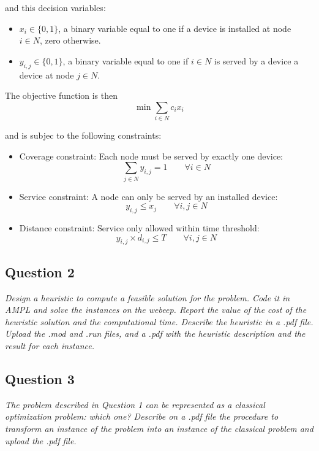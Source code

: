 \documentclass[10pt]{article}
\begin{document}
    and this decision variables:
    \begin{itemize}
        \item $x_i \in \{0,1\}$, a binary variable equal to one if a device is installed at node $i \in N$, zero otherwise.
        \item $y_{i,j} \in \{0,1\}$, a binary variable equal to one if $i \in N$ is served by a device a device at node $j \in N$.
    \end{itemize}

    The objective function is then
    \begin{equation}
        \min \sum_{i \in N} c_i x_i
    \end{equation}

    and is subjec to the following constraints:
    \begin{itemize}
        \item Coverage constraint: Each node must be served by exactly one device:
        \[
            \sum_{j \in N} y_{i,j} = 1 \qquad \forall i \in N
        \]
        \item Service constraint: A node can only be served by an installed device:
        \[
            y_{i,j} \le x_j \qquad \forall i,j \in N
        \]
        \item Distance constraint: Service only allowed within time threshold:
        \[
            y_{i,j} \times d_{i,j} \le T \qquad \forall i,j \in N
        \]
    \end{itemize}








    \subsection*{Question 2}
    \textit{Design a heuristic to compute a feasible solution for the problem. Code it in AMPL and solve the instances on the webeep. Report the value of the cost of the heuristic solution and the computational time. Describe the heuristic in a .pdf file. Upload the .mod and .run files, and a .pdf with the heuristic description and the result for each instance.}

    

    \subsection*{Question 3}
    \textit{The problem described in Question 1 can be represented as a classical optimization problem: which one? Describe on a .pdf file the procedure to transform an instance of the problem into an instance of the classical problem and upload the .pdf file.}
\end{document}
